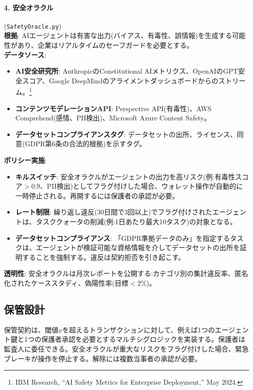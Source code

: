 \documentclass[11pt]{article}
\begin{document}
\paragraph{4. 安全オラクル} (\texttt{SafetyOracle.py})\\
\textbf{根拠}: AIエージェントは有害な出力(バイアス、有毒性、誤情報)を生成する可能性があり、企業はリアルタイムのセーフガードを必要とする。\\
\textbf{データソース}:
\begin{itemize}[noitemsep]
  \item \textbf{AI安全研究所}: AnthropicのConstitutional AIメトリクス、OpenAIのGPT安全スコア、Google DeepMindのアライメントダッシュボードからのストリーム。\footnote{IBM Research, ``AI Safety Metrics for Enterprise Deployment,'' May 2024.}
  \item \textbf{コンテンツモデレーションAPI}: Perspective API(有毒性)、AWS Comprehend(感情、PII検出)、Microsoft Azure Content Safety。
  \item \textbf{データセットコンプライアンスタグ}: データセットの出所、ライセンス、同意(GDPR第6条の合法的根拠)を示すタグ。
\end{itemize}
\textbf{ポリシー実施}:
\begin{itemize}[noitemsep]
  \item \textbf{キルスイッチ}: 安全オラクルがエージェントの出力を高リスク(例:有毒性スコア$>0.9$、PII検出)としてフラグ付けした場合、ウォレット操作が自動的に一時停止される。再開するには保護者の承認が必要。
  \item \textbf{レート制限}: 繰り返し違反(30日間で3回以上)でフラグ付けされたエージェントは、タスククォータの削減(例:1日あたり最大10タスク)の対象となる。
  \item \textbf{データセットコンプライアンス}: 「GDPR準拠データのみ」を指定するタスクは、エージェントが検証可能な資格情報を介してデータセットの出所を証明することを強制する。違反は契約拒否を引き起こす。
\end{itemize}
\textbf{透明性}: 安全オラクルは月次レポートを公開する:カテゴリ別の集計違反率、匿名化されたケーススタディ、偽陽性率(目標$<2\%$)。

\subsection{保管設計}
保管契約は、閾値$x$を超えるトランザクションに対して、例えば1つのエージェント鍵と1つの保護者承認を必要とするマルチシグロジックを実装する。保護者は監査人に委任できる。安全オラクルが重大なリスクをフラグ付けした場合、緊急ブレーキが操作を停止する。解除には複数当事者の承認が必要。
\end{document}
